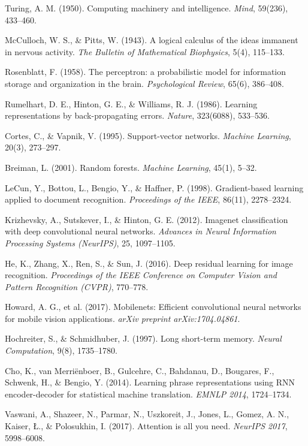 \documentclass[12pt,a4paper]{report}
\begin{document}
\begin{enumerate}[leftmargin=1.5cm, label={[\arabic*]}]
    \item Turing, A. M. (1950). Computing machinery and intelligence. \textit{Mind}, 59(236), 433--460.
    \item McCulloch, W. S., \& Pitts, W. (1943). A logical calculus of the ideas immanent in nervous activity. \textit{The Bulletin of Mathematical Biophysics}, 5(4), 115--133.
    \item Rosenblatt, F. (1958). The perceptron: a probabilistic model for information storage and organization in the brain. \textit{Psychological Review}, 65(6), 386--408.
    \item Rumelhart, D. E., Hinton, G. E., \& Williams, R. J. (1986). Learning representations by back-propagating errors. \textit{Nature}, 323(6088), 533--536.
    \item Cortes, C., \& Vapnik, V. (1995). Support-vector networks. \textit{Machine Learning}, 20(3), 273--297.
    \item Breiman, L. (2001). Random forests. \textit{Machine Learning}, 45(1), 5--32.
    \item LeCun, Y., Bottou, L., Bengio, Y., \& Haffner, P. (1998). Gradient-based learning applied to document recognition. \textit{Proceedings of the IEEE}, 86(11), 2278--2324.
    \item Krizhevsky, A., Sutskever, I., \& Hinton, G. E. (2012). Imagenet classification with deep convolutional neural networks. \textit{Advances in Neural Information Processing Systems (NeurIPS)}, 25, 1097--1105.
    \item He, K., Zhang, X., Ren, S., \& Sun, J. (2016). Deep residual learning for image recognition. \textit{Proceedings of the IEEE Conference on Computer Vision and Pattern Recognition (CVPR)}, 770--778.
    \item Howard, A. G., et al. (2017). Mobilenets: Efficient convolutional neural networks for mobile vision applications. \textit{arXiv preprint arXiv:1704.04861}.
    \item Hochreiter, S., \& Schmidhuber, J. (1997). Long short-term memory. \textit{Neural Computation}, 9(8), 1735--1780.
    \item Cho, K., van Merriënboer, B., Gulcehre, C., Bahdanau, D., Bougares, F., Schwenk, H., \& Bengio, Y. (2014). Learning phrase representations using RNN encoder-decoder for statistical machine translation. \textit{EMNLP 2014}, 1724--1734.
    \item Vaswani, A., Shazeer, N., Parmar, N., Uszkoreit, J., Jones, L., Gomez, A. N., Kaiser, Ł., \& Polosukhin, I. (2017). Attention is all you need. \textit{NeurIPS 2017}, 5998--6008.

\end{enumerate}
\end{document}
